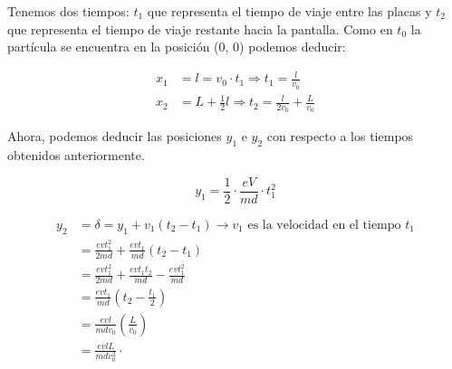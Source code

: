 \documentclass[11pt]{article}
\begin{document}
Tenemos dos tiempos: $t_1$ que representa el tiempo de viaje entre las placas y
$t_2$ que representa el tiempo de viaje restante hacia la pantalla. Como en
$t_0$ la partícula se encuentra en la posición (0, 0) podemos deducir:

\begin{align*}
  x_1 &= l = v_0 \cdot t_1 \Rightarrow t_1 = \frac{l}{v_0} \\
  x_2 &= L + \frac{1}{2}l \Rightarrow t_2 = \frac{l}{2v_0} + \frac{L}{v_0}
\end{align*}

Ahora, podemos deducir las posiciones $y_1$ e $y_2$ con respecto a los tiempos
obtenidos anteriormente.

\begin{equation*}
  y_1 = \frac{1}{2} \cdot \frac{eV}{md} \cdot t_1^2
\end{equation*}

\begin{align*}
  y_2 &= \delta = y_1 + v_1 (t_2 - t_1) \rightarrow \text{$v_1$ es la velocidad en el tiempo $t_1$} \\
      &= \frac{e v t_1^2}{2 m d} + \frac{e v t_1}{m d} (t_2 - t_1) \\
      &= \frac{e v t_1^2}{2 m d} + \frac{e v t_1 t_2}{m d} - \frac{e v t_1^2}{m d} \\
      &= \frac{e v t_1}{m d} (t_2 - \frac{t_1}{2}) \\
      &= \frac{e v l}{m d v_0} (\frac{L}{v_0}) \\
      &= \frac{e v l L}{m d v_0^2} \cdot
\end{align*}
\end{document}
